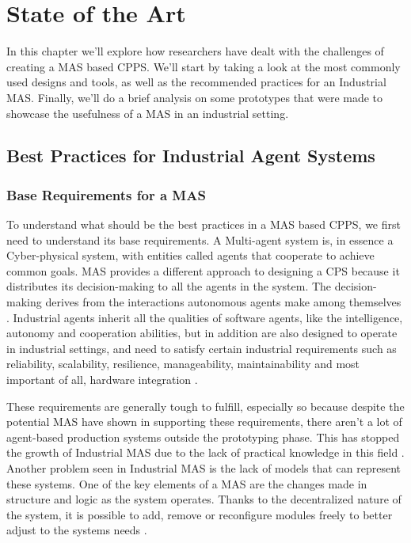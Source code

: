 

\chapter{State of the Art}
\label{cha:state-of-the-art}

In this chapter we'll explore how researchers have dealt with the challenges of creating a MAS based CPPS. We'll start by taking a look at the most commonly used designs and tools, as well as the recommended practices for an Industrial MAS. Finally, we'll do a brief analysis on some prototypes that were made to showcase the usefulness of a MAS in an industrial setting.

\section{Best Practices for Industrial Agent Systems}
\label{sec:best_practices}
\subsection{Base Requirements for a MAS}

To understand what should be the best practices in a MAS based CPPS, we first need to understand its base requirements. A Multi-agent system is, in essence a Cyber-physical system, with entities called agents that cooperate to achieve common goals. MAS provides a different approach to designing a CPS because it distributes its decision-making to all the agents in the system. The decision-making derives from the interactions autonomous agents make among themselves \cite{Leitao2021}. Industrial agents inherit all the qualities of software agents, like the intelligence, autonomy and cooperation abilities, but in addition are also designed to operate in industrial settings, and need to satisfy certain industrial requirements such as reliability, scalability, resilience, manageability, maintainability and most important of all, hardware integration \cite{Leitao2021}.

These requirements are generally tough to fulfill, especially so because despite the potential MAS have shown in supporting these requirements, there aren't a lot of agent-based production systems outside the prototyping phase. This has stopped the growth of Industrial MAS due to the lack of practical knowledge in this field \cite{Karnouskos2019}. Another problem seen in Industrial MAS is the lack of models that can represent these systems. One of the key elements of a MAS are the changes made in structure and logic as the system operates. Thanks to the decentralized nature of the system, it is possible to add, remove or reconfigure modules freely to better adjust to the systems needs \cite{Karnouskos2019}.

